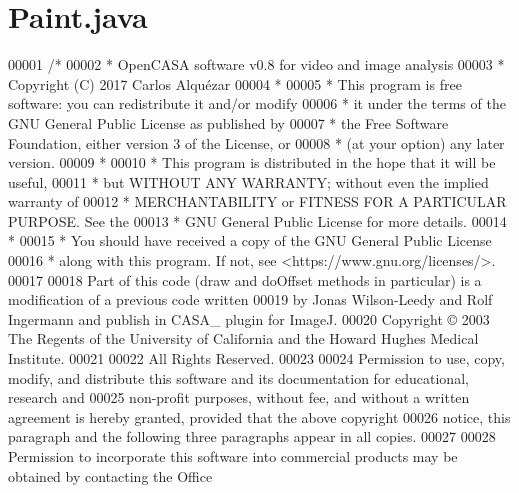 \hypertarget{_paint_8java_source}{}\section{Paint.\+java}
\label{_paint_8java_source}

\begin{DoxyCode}
00001 \textcolor{comment}{/*}
00002 \textcolor{comment}{ *   OpenCASA software v0.8 for video and image analysis}
00003 \textcolor{comment}{ *   Copyright (C) 2017  Carlos Alquézar}
00004 \textcolor{comment}{ *}
00005 \textcolor{comment}{ *   This program is free software: you can redistribute it and/or modify}
00006 \textcolor{comment}{ *   it under the terms of the GNU General Public License as published by}
00007 \textcolor{comment}{ *   the Free Software Foundation, either version 3 of the License, or}
00008 \textcolor{comment}{ *   (at your option) any later version.}
00009 \textcolor{comment}{ *}
00010 \textcolor{comment}{ *   This program is distributed in the hope that it will be useful,}
00011 \textcolor{comment}{ *   but WITHOUT ANY WARRANTY; without even the implied warranty of}
00012 \textcolor{comment}{ *   MERCHANTABILITY or FITNESS FOR A PARTICULAR PURPOSE.  See the}
00013 \textcolor{comment}{ *   GNU General Public License for more details.}
00014 \textcolor{comment}{ *}
00015 \textcolor{comment}{ *   You should have received a copy of the GNU General Public License}
00016 \textcolor{comment}{ *   along with this program.  If not, see <https://www.gnu.org/licenses/>.}
00017 \textcolor{comment}{}
00018 \textcolor{comment}{Part of this code (draw and doOffset methods in particular) is a modification of a previous code written }
00019 \textcolor{comment}{by Jonas Wilson-Leedy and Rolf Ingermann and publish in CASA\_ plugin for ImageJ.}
00020 \textcolor{comment}{Copyright © 2003 The Regents of the University of California and the Howard Hughes Medical Institute.}
00021 \textcolor{comment}{}
00022 \textcolor{comment}{All Rights Reserved.}
00023 \textcolor{comment}{}
00024 \textcolor{comment}{Permission to use, copy, modify, and distribute this software and its documentation for educational,
       research and }
00025 \textcolor{comment}{non-profit purposes, without fee, and without a written agreement is hereby granted, provided that the
       above copyright }
00026 \textcolor{comment}{notice, this paragraph and the following three paragraphs appear in all copies.}
00027 \textcolor{comment}{}
00028 \textcolor{comment}{Permission to incorporate this software into commercial products may be obtained by contacting the Office
}
\end{DoxyCode}
